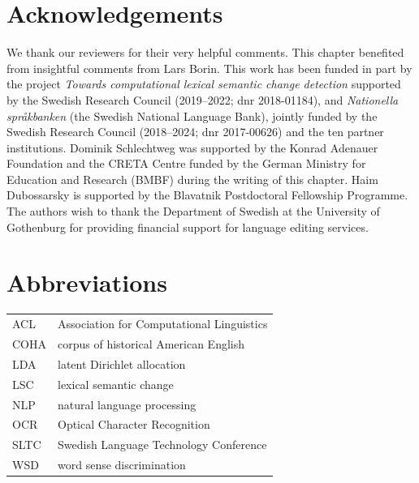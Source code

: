 \documentclass[output=paper]{langscibook}
\begin{document}
\section*{Acknowledgements}
We thank our reviewers for their very helpful comments.
This chapter benefited from insightful comments from Lars Borin.
This work has been funded in part by the project \textit{Towards computational lexical semantic change detection} supported by the Swedish Research Council (2019--2022; dnr 2018-01184), and \emph{Nationella språkbanken} (the Swedish National Language Bank), jointly funded  by  the Swedish Research Council (2018--2024; dnr 2017-00626) and the ten partner institutions.
Dominik Schlechtweg was supported by the Konrad Adenauer Foundation and the CRETA Centre funded by the German Ministry for Education and Research (BMBF) during the writing of this chapter.
Haim Dubossarsky is supported by the Blavatnik Postdoctoral Fellowship Programme.
The authors wish to thank the Department of Swedish at the University of Gothenburg for providing financial support for language editing services.

\section*{Abbreviations}
\begin{tabularx}{\textwidth}{@{}lQ@{}}
ACL & Association for Computational Linguistics \\
COHA & corpus of historical American English \\
LDA & latent Dirichlet allocation\\
LSC & lexical semantic change\\
NLP & natural language processing \\
OCR & Optical Character Recognition\\
SLTC & Swedish Language Technology Conference\\
WSD & word sense discrimination \\
\end{tabularx}

{\sloppy\printbibliography[heading=subbibliography,notkeyword=this]}
\end{document}
